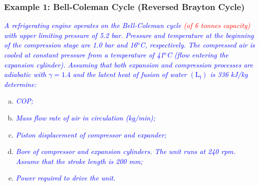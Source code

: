 \documentclass[10pt,compress]{beamer}
\begin{document}
\begin{frame}
 \frametitle{Example 1: Bell-Coleman Cycle (Reversed Brayton Cycle)}
\textcolor{blue}{{\it A refrigerating engine operates on the Bell-Coleman cycle \textcolor{red}{(of 6 tonnes capacity)} with upper limiting pressure of 5.2 bar. Pressure and temperature at the beginning of the compression stage are 1.0 bar and 16$^{\text{o}}$C, respectively. The compressed air is cooled at constant pressure from a temperature of 41$^{\text{o}}$C  (flow entering the expansion cylinder). Assuming that both expansion and compression processes are adiabatic with $\gamma=1.4$ and the latent heat of fusion of water $\left(\text{L}_{\text{f}}\right)$ is 336 kJ/kg determine:}}

\begin{enumerate}[(a)]
\item \textcolor{blue}{{\it COP;}}
\item \textcolor{blue}{{\it Mass flow rate of air in circulation (kg/min);}}
\item \textcolor{blue}{{\it Piston displacement of compressor and expander;}}
\item \textcolor{blue}{{\it Bore of compressor and expansion cylinders. The unit runs at 240 rpm. Assume that the stroke length is 200 mm;}}
\item \textcolor{blue}{{\it Power required to drive the unit.}}
\end{enumerate}

\end{frame}
\end{document}
